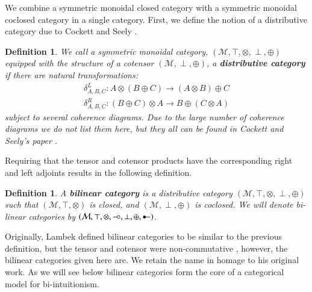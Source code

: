 \documentclass{lmcs}
\newtheorem{definition}[theorem]{Definition}
\let\mto\to
\let\to\relax
\newcommand{\to}{\rightarrow}
\newcommand{\cat}[1]{\mathcal{#1}}
\newcommand{\limp}[0]{\multimap}
\newcommand{\colimp}[0]{\multimapdotinv}
\def\limp{\mathrel{-\!\circ}}
\begin{document}
We combine a symmetric monoidal closed category with a symmetric
monoidal coclosed category in a single category.  First, we define the
notion of a distributive category due to Cockett and Seely
\cite{Cockett:1997}.
\begin{definition}
  \label{def:dist-cat}
  We call a symmetric monoidal category, $(\cat{M}, \top, \otimes,
  \perp, \oplus)$ equipped with the structure of a cotensor $(\cat{M},
  \perp, \oplus)$, a \textbf{distributive category} if there are
  natural transformations:
  \[
  \begin{array}{lll}
    \delta^L_{A,B,C} : A \otimes (B \oplus C) \mto (A \otimes B) \oplus C\\
    \delta^R_{A,B,C} : (B \oplus C) \otimes A \mto B \oplus (C \otimes A)
  \end{array}
  \]
  subject to several coherence diagrams.  Due to the large number of
  coherence diagrams we do not list them here, but they all can be
  found in Cockett and Seely's paper \cite{Cockett:1997}.
\end{definition}
\noindent
Requiring that the tensor and cotensor products have the corresponding
right and left adjoints results in the following definition.
\begin{definition}
  \label{def:bilinear-cat}
  A \textbf{bilinear category} is a distributive category $(\cat{M},
  \top, \otimes, \perp, \oplus)$ such that $(\cat{M}, \top, \otimes)$
  is closed, and $(\cat{M}, \perp, \oplus)$ is coclosed.  We will
  denote bi-linear categories by $(\cat{M}, \top, \otimes, \limp, \perp,
  \oplus, \colimp)$.
\end{definition}
Originally, Lambek defined bilinear categories to be similar to the
previous definition, but the tensor and cotensor were non-commutative
\cite{Cockett:1997a}, however, the bilinear categories given here
are. We retain the name in homage to his original work.  As we will
see below bilinear categories form the core of a categorical model for
bi-intuitionism.
\end{document}
